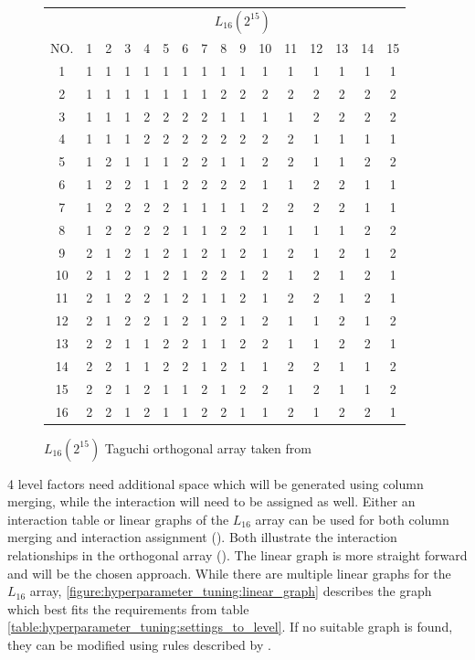\begin{figure}[ht]
	\centering
\begin{tabular}{ |c||c|c|c|c|c|c|c|c|c|c|c|c|c|c|c|  }
	\hline
	   & \multicolumn{15}{c|}{ $L_{16}(2^{15})$ } \\
	NO.& 1 & 2 & 3 & 4 & 5 & 6 & 7 & 8 & 9 & 10& 11& 12& 13& 14&15\\
	\hline
	1  & 1 & 1 & 1 & 1 & 1 & 1 & 1 & 1 & 1 & 1 & 1 & 1 & 1 & 1 & 1\\
	2  & 1 & 1 & 1 & 1 & 1 & 1 & 1 & 2 & 2 & 2 & 2 & 2 & 2 & 2 & 2\\
	3  & 1 & 1 & 1 & 2 & 2 & 2 & 2 & 1 & 1 & 1 & 1 & 2 & 2 & 2 & 2\\
	4  & 1 & 1 & 1 & 2 & 2 & 2 & 2 & 2 & 2 & 2 & 2 & 1 & 1 & 1 & 1\\
	5  & 1 & 2 & 1 & 1 & 1 & 2 & 2 & 1 & 1 & 2 & 2 & 1 & 1 & 2 & 2\\
	6  & 1 & 2 & 2 & 1 & 1 & 2 & 2 & 2 & 2 & 1 & 1 & 2 & 2 & 1 & 1\\
	7  & 1 & 2 & 2 & 2 & 2 & 1 & 1 & 1 & 1 & 2 & 2 & 2 & 2 & 1 & 1\\
	8  & 1 & 2 & 2 & 2 & 2 & 1 & 1 & 2 & 2 & 1 & 1 & 1 & 1 & 2 & 2\\
	9  & 2 & 1 & 2 & 1 & 2 & 1 & 2 & 1 & 2 & 1 & 2 & 1 & 2 & 1 & 2\\
	10 & 2 & 1 & 2 & 1 & 2 & 1 & 2 & 2 & 1 & 2 & 1 & 2 & 1 & 2 & 1\\
	11 & 2 & 1 & 2 & 2 & 1 & 2 & 1 & 1 & 2 & 1 & 2 & 2 & 1 & 2 & 1\\
	12 & 2 & 1 & 2 & 2 & 1 & 2 & 1 & 2 & 1 & 2 & 1 & 1 & 2 & 1 & 2\\
	13 & 2 & 2 & 1 & 1 & 2 & 2 & 1 & 1 & 2 & 2 & 1 & 1 & 2 & 2 & 1\\
	14 & 2 & 2 & 1 & 1 & 2 & 2 & 1 & 2 & 1 & 1 & 2 & 2 & 1 & 1 & 2\\
	15 & 2 & 2 & 1 & 2 & 1 & 1 & 2 & 1 & 2 & 2 & 1 & 2 & 1 & 1 & 2\\
	16 & 2 & 2 & 1 & 2 & 1 & 1 & 2 & 2 & 1 & 1 & 2 & 1 & 2 & 2 & 1\\
	\hline
\end{tabular}
\label{table:hyperparameter_tuning:L16_orhtogonal_array}
\caption{ $L_{16}(2^{15})$ Taguchi orthogonal array taken from \cite{roy_primer_1990}}
\end{figure}

4 level factors need additional space which will be generated using column merging, while the interaction will need to be assigned as well.
Either an interaction table or linear graphs of the $L_{16}$ array can be used for both column merging and interaction assignment (\cite{nazandanacioglu_taguchi_2005}). Both illustrate the interaction relationships in the orthogonal array (\cite{yang_design_2009}).
The linear graph is more straight forward and will be the chosen approach. While there are multiple linear graphs for the $L_{16}$ array, \ref{figure:hyperparameter_tuning:linear_graph} describes the graph which best fits the requirements from table \ref{table:hyperparameter_tuning:settings_to_level}. If no suitable graph is found, they can be modified using rules described by \cite{nazandanacioglu_taguchi_2005}.

